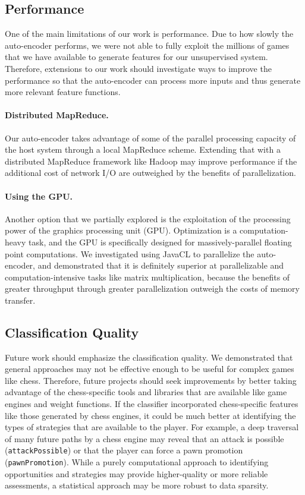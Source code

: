 \documentclass[11pt]{article}
\begin{document}
\subsection{Performance}
One of the main limitations of our work is performance. Due to how slowly the auto-encoder performs, we were not able to fully exploit the millions of games that we have available to generate features for our unsupervised system. Therefore, extensions to our work should investigate ways to improve the performance so that the auto-encoder can process more inputs and thus generate more relevant feature functions.

\paragraph{Distributed MapReduce.}
Our auto-encoder takes advantage of some of the parallel processing capacity of the host system through a local MapReduce scheme. Extending that with a distributed MapReduce framework like Hadoop may improve performance if the additional cost of network I/O are outweighed by the benefits of parallelization.

\paragraph{Using the GPU.}
Another option that we partially explored is the exploitation of the processing power of the graphics processing unit (GPU). Optimization is a computation-heavy task, and the GPU is specifically designed for massively-parallel floating point computations. We investigated using JavaCL to parallelize the auto-encoder, and demonstrated that it is definitely superior at parallelizable and computation-intensive tasks like matrix multiplication, because the benefits of greater throughput through greater parallelization outweigh the costs of memory transfer.

\subsection{Classification Quality}
Future work should emphasize the classification quality. We demonstrated that general approaches may not be effective enough to be useful for complex games like chess. Therefore, future projects should seek improvements by better taking advantage of the chess-specific tools and libraries that are available like game engines and weight functions. If the classifier incorporated chess-specific features like those generated by chess engines, it could be much better at identifying the types of strategies that are available to the player. For example, a deep traversal of many future paths by a chess engine may reveal that an attack is possible ({\tt attackPossible}) or that the player can force a pawn promotion ({\tt pawnPromotion}). While a purely computational approach to identifying opportunities and strategies may provide higher-quality or more reliable assessments, a statistical approach may be more robust to data sparsity.
\end{document}
